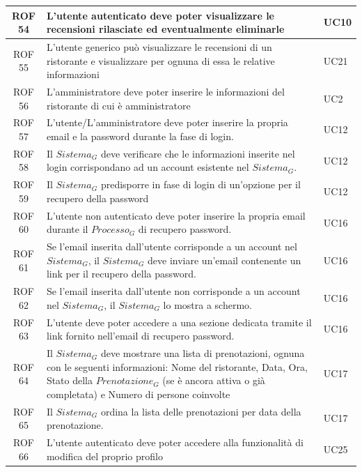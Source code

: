 \documentclass[12pt, oneside]{article}
\begin{document}
\begin{longtable}{|c|p{14cm}|p{2cm}|}
    \hline
    ROF 54 & L'utente autenticato deve poter visualizzare le recensioni rilasciate ed eventualmente eliminarle & UC10 \\
    \hline
    ROF 55 & L'utente generico può visualizzare le recensioni di un ristorante e visualizzare per ognuna di essa le relative informazioni & UC21 \\
    \hline
    ROF 56 & L'amministratore deve poter inserire le informazioni del ristorante di cui è amministratore & UC2 \\
    \hline
    ROF 57 & L'utente/L'amministratore deve poter inserire la propria email e la password durante la fase di login.  & UC12 \\
    \hline
    ROF 58 & Il $\textit{Sistema}_G$ deve verificare che le informazioni inserite nel login corrispondano ad un account esistente nel $\textit{Sistema}_G$.  & UC12 \\
    \hline
    ROF 59 & Il $\textit{Sistema}_G$ predisporre in fase di login di un'opzione per il recupero della password  & UC12 \\
    \hline
    ROF 60 & L'utente non autenticato deve poter inserire la propria email durante il $\textit{Processo}_G$ di recupero password.  & UC16 \\
    \hline
    ROF 61 & Se l'email inserita dall'utente corrisponde a un account nel $\textit{Sistema}_G$, il $\textit{Sistema}_G$ deve inviare un'email contenente un link per il recupero della password.  & UC16 \\
    \hline
    ROF 62 & Se l'email inserita dall'utente non corrisponde a un account nel $\textit{Sistema}_G$, il $\textit{Sistema}_G$ lo mostra a schermo.  & UC16 \\
    \hline
    ROF 63 & L'utente deve poter accedere a una sezione dedicata tramite il link fornito nell'email di recupero password.  & UC16 \\
    \hline
    ROF 64 & Il $\textit{Sistema}_G$ deve mostrare una lista di prenotazioni, ognuna con le seguenti informazioni:
    Nome del ristorante, Data, Ora, Stato della $\textit{Prenotazione}_G$ (se è ancora attiva o già completata) e Numero di persone coinvolte & UC17 \\
    \hline
    ROF 65 & Il $\textit{Sistema}_G$ ordina la lista delle prenotazioni per data della prenotazione.  & UC17 \\
    \hline
    ROF 66 & L'utente autenticato deve poter accedere alla funzionalità di modifica del proprio profilo  & UC25 \\
    \hline

\end{longtable}
\end{document}

